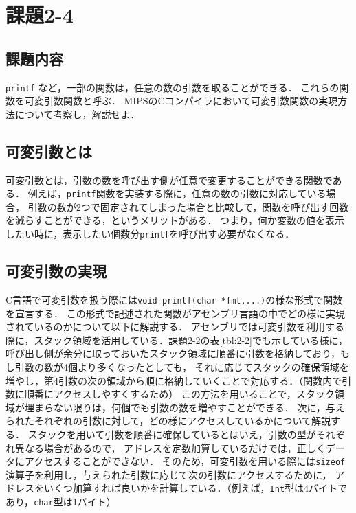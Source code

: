 \documentclass[a4j,11pt]{jarticle}
\begin{document}
\section{課題2-4}
\subsection{課題内容}

{\tt printf} など，一部の関数は，任意の数の引数を取ることができる．
これらの関数を可変引数関数と呼ぶ．
MIPSのCコンパイラにおいて可変引数関数の実現方法について考察し，解説せよ．

\subsection{可変引数とは}

可変引数とは，引数の数を呼び出す側が任意で変更することができる関数である．
例えば，{\tt printf}関数を実装する際に，任意の数の引数に対応している場合，
引数の数が2つで固定されてしまった場合と比較して，関数を呼び出す回数を減らすことができる，というメリットがある．
つまり，何か変数の値を表示したい時に，表示したい個数分{\tt printf}を呼び出す必要がなくなる．

\subsection{可変引数の実現}

C言語で可変引数を扱う際には{\tt void printf(char *fmt,...)}の様な形式で関数を宣言する．
この形式で記述された関数がアセンブリ言語の中でどの様に実現されているのかについて以下に解説する．
アセンブリでは可変引数を利用する際に，スタック領域を活用している．課題2-2の表\ref{tbl:2-2}でも示している様に，
呼び出し側が余分に取っておいたスタック領域に順番に引数を格納しており，もし引数の数が4個より多くなったとしても，
それに応じてスタックの確保領域を増やし，第4引数の次の領域から順に格納していくことで対応する．（関数内で引数に順番にアクセスしやすくするため）
この方法を用いることで，スタック領域が埋まらない限りは，何個でも引数の数を増やすことができる．
次に，与えられたそれぞれの引数に対して，どの様にアクセスしているかについて解説する．
スタックを用いて引数を順番に確保しているとはいえ，引数の型がそれぞれ異なる場合があるので，
アドレスを定数加算しているだけでは，正しくデータにアクセスすることができない．
そのため，可変引数を用いる際には{\tt sizeof}演算子を利用し，与えられた引数に応じて次の引数にアクセスするために，
アドレスをいくつ加算すれば良いかを計算している．（例えば，{\tt Int}型は4バイトであり，{\tt char}型は1バイト）
\end{document}
